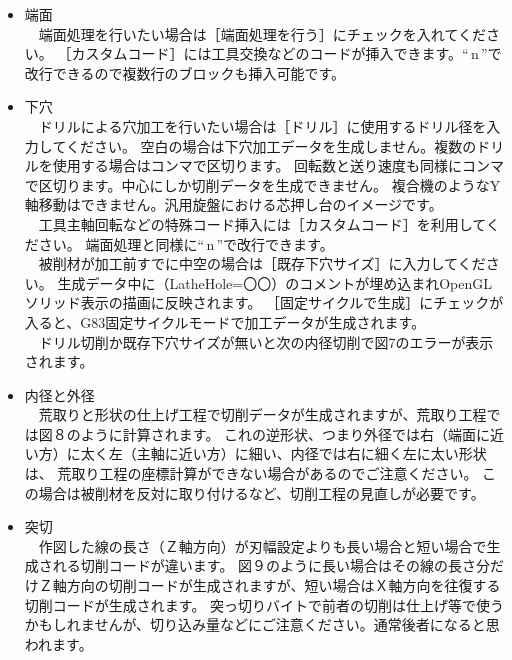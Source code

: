\begin{itemize}
\item 端面\\
　端面処理を行いたい場合は［端面処理を行う］にチェックを入れてください。
［カスタムコード］には工具交換などのコードが挿入できます。``\,\yen{}n\,''で改行できるので複数行のブロックも挿入可能です。

\vspace*{1zh}
\item 下穴\\
　ドリルによる穴加工を行いたい場合は［ドリル］に使用するドリル径を入力してください。
空白の場合は下穴加工データを生成しません。複数のドリルを使用する場合はコンマで区切ります。
回転数と送り速度も同様にコンマで区切ります。中心にしか切削データを生成できません。
複合機のようなY軸移動はできません。汎用旋盤における芯押し台のイメージです。\\
　工具主軸回転などの特殊コード挿入には［カスタムコード］を利用してください。
端面処理と同様に``\,\yen{}n\,''で改行できます。\\
　被削材が加工前すでに中空の場合は［既存下穴サイズ］に入力してください。
生成データ中に（LatheHole=〇〇）のコメントが埋め込まれOpenGLソリッド表示の描画に反映されます。
［固定サイクルで生成］にチェックが入ると、G83固定サイクルモードで加工データが生成されます。\\
　ドリル切削か既存下穴サイズが無いと次の内径切削で図7のエラーが表示されます。


\vspace*{1zh}
\item 内径と外径\\
　荒取りと形状の仕上げ工程で切削データが生成されますが、荒取り工程では図８のように計算されます。
これの逆形状、つまり外径では右（端面に近い方）に太く左（主軸に近い方）に細い、内径では右に細く左に太い形状は、
荒取り工程の座標計算ができない場合があるのでご注意ください。
この場合は被削材を反対に取り付けるなど、切削工程の見直しが必要です。


\vspace*{1zh}
\item 突切\\
　作図した線の長さ（Ｚ軸方向）が刃幅設定よりも長い場合と短い場合で生成される切削コードが違います。
図９のように長い場合はその線の長さ分だけＺ軸方向の切削コードが生成されますが、短い場合はＸ軸方向を往復する切削コードが生成されます。
突っ切りバイトで前者の切削は仕上げ等で使うかもしれませんが、切り込み量などにご注意ください。通常後者になると思われます。


\end{itemize}
